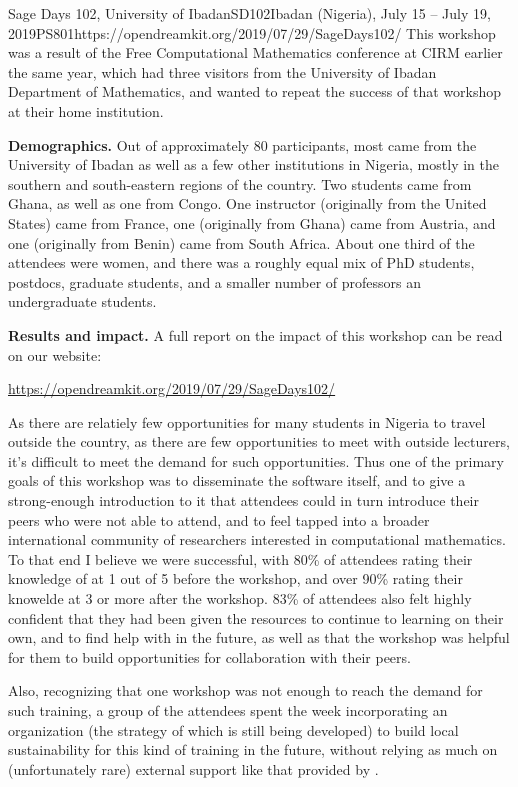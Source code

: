 \begin{event}{Sage Days 102, University of Ibadan}{SD102}{Ibadan (Nigeria), July 15 -- July 19, 2019}{PS}{80}{1}{https://opendreamkit.org/2019/07/29/SageDays102/}
This workshop was a result of the Free Computational Mathematics conference at
CIRM earlier the same year, which had three visitors from the University
of Ibadan Department of Mathematics, and wanted to repeat the success of
that workshop at their home institution.


\textbf{Demographics.} Out of approximately 80 participants, most came from the
University of Ibadan as well as a few other institutions in Nigeria,
mostly in the southern and south-eastern regions of the country.  Two
students came from Ghana, as well as one from Congo.  One instructor
(originally from the United States) came from France, one (originally
from Ghana) came from Austria, and one (originally from Benin) came
from South Africa.  About one third of the attendees were women, and
there was a roughly equal mix of PhD students, postdocs, graduate
students, and a smaller number of professors an undergraduate students.

\textbf{Results and impact.} A full report on the impact of this
workshop can be read on our website:
\centerline{\url{https://opendreamkit.org/2019/07/29/SageDays102/}}

As there are relatiely few opportunities for many students in Nigeria to travel
outside the country, as there are few opportunities to meet with
outside lecturers, it's difficult to meet the demand for such
opportunities. Thus one of the primary goals of this workshop was to
disseminate the software itself, and to give a strong-enough
introduction to it that attendees could in turn introduce their peers
who were not able to attend, and to feel tapped into a broader
international community of researchers interested in computational
mathematics. To that end I believe we were successful, with 80\% of
attendees rating their knowledge of \Sage at 1 out of 5 before the
workshop, and over 90\% rating their knowelde at 3 or more after the
workshop.  83\% of attendees also felt highly confident that they had
been given the resources to continue to learning on their own, and to
find help with \Sage in the future, as well as that the workshop was
helpful for them to build opportunities for collaboration with their
peers.

Also, recognizing that one workshop was not enough to reach the demand for such
training, a group of the attendees spent the week incorporating an
organization (the strategy of which is still being developed) to build
local sustainability for this kind of training in the future, without
relying as much on (unfortunately rare) external support like that provided
by \ODK.


\end{event}
